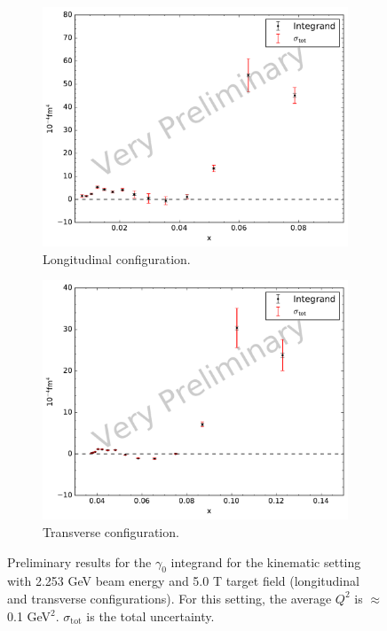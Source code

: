 \begin{figure}[p!]
  \centering
  \begin{subfigure}[t]{0.79\textwidth}
    \includegraphics[width=\textwidth]{figs/gamma0-model-22535000.pdf}
    \caption{Longitudinal configuration. \label{C8S5F1a}}
  \end{subfigure}
  \begin{subfigure}[t]{0.79\textwidth}
    \includegraphics[width=\textwidth]{figs/gamma0-model-22535090.pdf}
    \caption{Transverse configuration. \label{C8S5F1b}}
  \end{subfigure}
  \caption[$\gamma_0$ integrand with $E=2.253$ GeV and $B=5.0$ T.]{Preliminary results for the $\gamma_0$ integrand for the kinematic setting with 2.253 GeV beam energy and 5.0 T target field (longitudinal and transverse configurations). For this setting, the average $Q^2$ is $\approx$0.1 GeV${}^2$. $\sigma_{\mathrm{tot}}$ is the total uncertainty. \label{C8S5F1}}
\end{figure}

